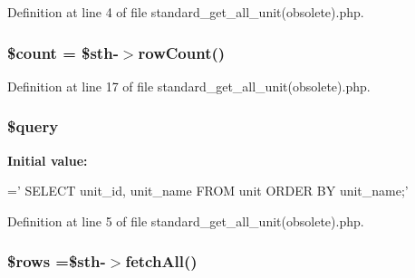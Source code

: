 Definition at line 4 of file standard\-\_\-get\-\_\-all\-\_\-unit(obsolete).\-php.

\hypertarget{standard__get__all__unit_07obsolete_08_8php_af789423037bbc89dc7c850e761177570}{
\subsubsection[{\$count}]{\setlength{\rightskip}{0pt plus 5cm}\$count = \$sth-\/$>$row\-Count()}}\label{standard__get__all__unit_07obsolete_08_8php_af789423037bbc89dc7c850e761177570}


Definition at line 17 of file standard\-\_\-get\-\_\-all\-\_\-unit(obsolete).\-php.

\hypertarget{standard__get__all__unit_07obsolete_08_8php_af59a5f7cd609e592c41dc3643efd3c98}{
\subsubsection[{\$query}]{\setlength{\rightskip}{0pt plus 5cm}\$query}}\label{standard__get__all__unit_07obsolete_08_8php_af59a5f7cd609e592c41dc3643efd3c98}
{\bfseries Initial value\-:}
\begin{DoxyCode}
=\textcolor{stringliteral}{'}
\textcolor{stringliteral}{    SELECT }
\textcolor{stringliteral}{        unit\_id,}
\textcolor{stringliteral}{        unit\_name}
\textcolor{stringliteral}{    FROM }
\textcolor{stringliteral}{        unit}
\textcolor{stringliteral}{    ORDER BY}
\textcolor{stringliteral}{        unit\_name;'}
\end{DoxyCode}


Definition at line 5 of file standard\-\_\-get\-\_\-all\-\_\-unit(obsolete).\-php.

\hypertarget{standard__get__all__unit_07obsolete_08_8php_ace2ec39e7df3899fa8df9640ec274b03}{
\subsubsection[{\$rows}]{\setlength{\rightskip}{0pt plus 5cm}\$rows =\$sth-\/$>$fetch\-All()}}\label{standard__get__all__unit_07obsolete_08_8php_ace2ec39e7df3899fa8df9640ec274b03}


